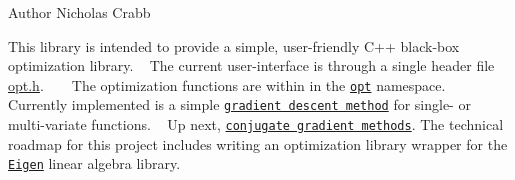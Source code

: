 \begin{DoxyAuthor}{Author}
Nicholas Crabb
\end{DoxyAuthor}
This library is intended to provide a simple, user-\/friendly C++ black-\/box optimization library. ~\newline
 The current user-\/interface is through a single header file \mbox{\hyperlink{opt_8h_source}{opt.\+h}}. ~\newline
 ~\newline
 The optimization functions are within in the \href{https://charelstoncrabb.github.io/basic_opt/html/namespaceopt.html}{\tt opt} namespace. ~\newline
 Currently implemented is a simple \href{https://en.wikipedia.org/wiki/Gradient_descent}{\tt gradient descent method} for single-\/ or multi-\/variate functions. ~\newline
 Up next, \href{https://en.wikipedia.org/wiki/Conjugate_gradient_method}{\tt conjugate gradient methods}. The technical roadmap for this project includes writing an optimization library wrapper for the \href{http://eigen.tuxfamily.org/index.php?title=Main_Page}{\tt Eigen} linear algebra library. 